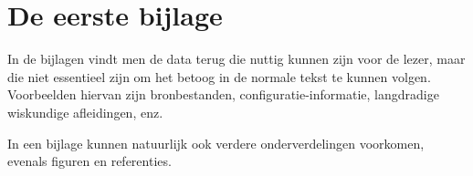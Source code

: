 \chapter{De eerste bijlage}
\label{app:A}

In de bijlagen vindt men de data terug die nuttig kunnen zijn voor de
lezer, maar die niet essentieel zijn om het betoog in de normale tekst te
kunnen volgen. Voorbeelden hiervan zijn bronbestanden,
configuratie-informatie, langdradige wiskundige afleidingen, enz.

In een bijlage kunnen natuurlijk ook verdere onderverdelingen voorkomen,
evenals figuren en referenties.

